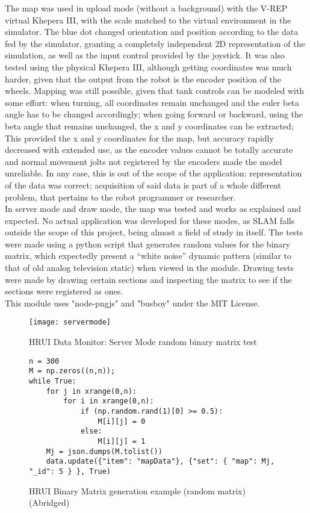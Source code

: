 The map was used in upload mode (without a background) with the V-REP virtual Khepera III, with the scale matched to the 
virtual environment in the simulator. The blue dot changed orientation and position according to the data fed by the 
simulator, granting a completely independent 2D representation of the simulation, as well as the input control provided by the 
joystick. It was also tested using the physical Khepera III, although getting coordinates was much harder, given that the 
output from the robot is the encoder position of the wheels. Mapping was still possible, given that tank controls can be 
modeled with some effort: when turning, all coordinates remain unchanged and the euler beta angle has to be changed 
accordingly; when going forward or backward, using the beta angle that remains unchanged, the x and y coordinates can be 
extracted; This provided the x and y coordinates for the map, but accuracy rapidly decreased with extended use, as the encoder 
values cannot be totally accurate and normal movement jolts not registered by the encoders made the model unreliable. In any 
case, this is out of the scope of the application: representation of the data was correct; acquisition of said data is part of 
a whole different problem, that pertains to the robot programmer or researcher.\\

In server mode and draw mode, the map was tested and works as explained and expected. No actual application was developed for 
these modes, as SLAM falls outside the scope of this project, being almost a field of study in itself. The tests were made 
using a python script that generates random values for the binary matrix, which expectedly present a ``white noise'' dynamic 
pattern (similar to that of old analog television static) when viewed in the module. Drawing tests were made by drawing 
certain sections and inspecting the matrix to see if the sections were registered as ones.\\

This module uses "node-pngjs"\cite{nodepngjs12} and "busboy"\cite{busboy13} under the MIT License.
\begin{figure}[H]
\centering
\captionsetup{justification=centering}
\texttt{[image: servermode]}
\caption{HRUI Data Monitor: Server Mode random binary matrix test}
\end{figure}
\begin{figure}[H]
\captionsetup{justification=centering}
\begin{verbatim}
n = 300
M = np.zeros((n,n));
while True:
	for j in xrange(0,n):
		for i in xrange(0,n):
			if (np.random.rand(1)[0] >= 0.5):
				M[i][j] = 0
			else:
				M[i][j] = 1
	Mj = json.dumps(M.tolist())
	data.update({"item": "mapData"}, {"set": { "map": Mj, "_id": 5 } }, True)
\end{verbatim}
\caption{HRUI Binary Matrix generation example (random matrix) (Abridged)}
\end{figure}
